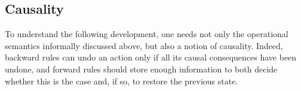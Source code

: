 \documentclass[runningheads]{llncs}
\newcommand{\arro}[1]{\xrightarrow{#1}}
\newcommand{\hoo}{\hookrightarrow}
\newcommand{\comp}{\:|\:}
\newcommand{\rfpair}[2]{(#1,#2)}
\newcommand{\set}[1]{\{#1\}}
\newcommand{\ms}[1]{\mathsf{#1}}
\let\l=\langle
\let\r=\rangle
\begin{document}
%	
%	
%	
%	
%	
%	
%	
%

\subsection{Causality}\label{sec:causality}
To understand the following development, one needs not only the
operational semantics informally discussed above, but also a notion of
causality. Indeed, backward rules can undo an action only if all its
causal consequences have been undone, and forward rules should store enough
information to both decide whether this is the case and, if so, to
restore the previous state.
\end{document}
